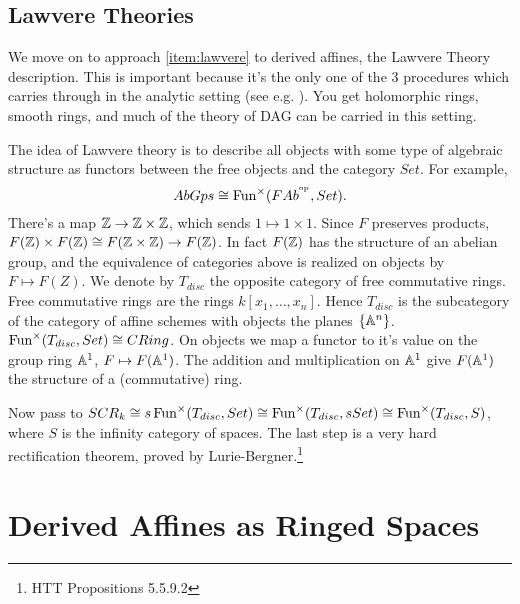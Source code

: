 \documentclass[10pt,a4paper,reqno,oneside]{book} %
\theoremstyle{plain}
\theoremstyle{definition}
\theoremstyle{remark}
\numberwithin{equation}{section}
\begin{document}

\subsection{Lawvere Theories}
\label{sect:lawvere}

We move on to approach \ref{item:lawvere} to derived affines, the Lawvere Theory description. 
This is important because
it's the only one of the 3 procedures which carries through in the analytic setting (see e.g. \cite{Porta_Yu_Higher_analytic_stacks_2014}). You get holomorphic rings, smooth rings,
and much of the theory of DAG can be carried in this setting.

The idea of Lawvere theory is to describe all objects with some type of algebraic structure as functors between the free objects and the category $Set$.
For example,
\[	AbGps \cong \operatorname{Fun}^{\times}(FAb^{^\mathrm{op}}, Set).	\]
There's a map $\mathbb Z \to \mathbb Z \times \mathbb Z$, which sends $1\mapsto 1\times 1$. Since $F$ preserves products, $F(\mathbb Z) \times F(\mathbb Z)
\cong F(\mathbb Z \times \mathbb Z) \to F(\mathbb Z)$.  In fact $F(\mathbb Z)$ has the structure of an abelian group, and the equivalence of categories above is realized on objects by $F \mapsto F(Z)$.  We denote by $T_{disc}$ the opposite category of free commutative rings.  Free commutative rings are the rings $k[x_1, \dots, x_n]$. Hence $T_{disc}$ is the subcategory of the category of affine schemes with objects the planes $\{\mathbb A^n\}$.
$\operatorname{Fun}^{\times}(T_{disc}, Set) \cong CRing$. On objects we map a functor to it's value on the group ring $\mathbb A^{1}$, $F\mapsto F(\mathbb A^{1})$.  The addition and multiplication on $\mathbb A^{1}$ give $F(\mathbb A^{1})$ the structure of a (commutative) ring.  

Now pass to $SCR_k \cong s\operatorname{Fun}^{\times}(T_{disc}, Set) \cong \operatorname{Fun}^{\times}(T_{disc}, sSet) \cong \operatorname{Fun}^{\times}
(T_{disc}, S)$, where $S$ is the infinity category of spaces. The last step is a very hard rectification theorem, proved
by Lurie-Bergner.\footnote{HTT Propositions 5.5.9.2} 


\section{Derived Affines as Ringed Spaces}
\end{document}

